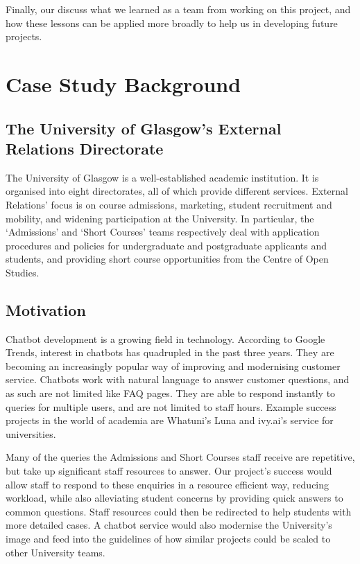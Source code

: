 \documentclass{l3proj}
\begin{document}
Finally, our  discuss what we learned as a team from working on this project, and how these lessons can be applied more broadly to help us in developing future projects.

\section{Case Study Background}
\label{sec:background}

\subsection{The University of Glasgow's External Relations Directorate}

The University of Glasgow is a well-established academic institution. It is organised into eight directorates, all of which provide different services. External Relations' focus is on course admissions, marketing, student recruitment and mobility, and widening participation at the University. In particular, the `Admissions' and `Short Courses' teams respectively deal with application procedures and policies for undergraduate and postgraduate applicants and students, and providing short course opportunities from the Centre of Open Studies.

\subsection{Motivation}

Chatbot development is a growing field in technology. According to Google Trends, interest in chatbots has quadrupled in the past three years\cite{googletrends}. They are becoming an increasingly popular way of improving and modernising customer service. Chatbots work with natural language to answer customer questions\cite{SLP:Jurafsky}, and as such are not limited like FAQ pages. They are able to respond instantly to queries for multiple users, and are not limited to staff hours\cite{chatbotbenefits}. Example success projects in the world of academia are Whatuni's Luna and ivy.ai's service for universities\cite{educationchatbots}.

Many of the queries the Admissions and Short Courses staff receive are repetitive, but take up significant staff resources to answer. Our project's success would allow staff to respond to these enquiries in a resource efficient way, reducing workload, while also alleviating student concerns by providing quick answers to common questions\cite{educationchatbots}. Staff resources could then be redirected to help students with more detailed cases. A chatbot service would also modernise the University's image and feed into the guidelines of how similar projects could be scaled to other University teams.
\end{document}
